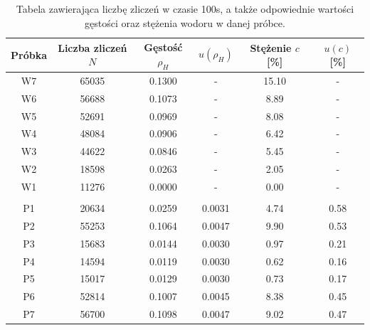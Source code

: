 \documentclass{article}
\begin{document}
\begin{table}[h!]
	\centering
	\caption{Tabela zawierająca liczbę zliczeń w czasie 100s, a także odpowiednie wartości gęstości oraz stężenia wodoru w danej próbce.}
	\begin{tabular}{|c|c|c|c|c|c|}
		\hline
		Próbka & Liczba zliczeń $N$ & Gęstość $\rho _H$ & $u(\rho _H)$ & Stężenie $c$ [\%] & $u(c)$ [\%] \\\hline
		W7 & 65035 & 0.1300 & - & 15.10 & - \\\hline 
		W6 & 56688 & 0.1073 & - & 8.89 & - \\\hline 
		W5 & 52691 & 0.0969 & - & 8.08 & - \\\hline 
		W4 & 48084 & 0.0906 & - & 6.42 & - \\\hline 
		W3 & 44622 & 0.0846 & - & 5.45 & - \\\hline 
		W2 & 18598 & 0.0263 & - & 2.05 & - \\\hline 
		W1 & 11276 & 0.0000 & - & 0.00 & - \\\hline 
		 & & & & & \\\hline
		P1 & 20634 & 0.0259 & 0.0031 & 4.74 & 0.58 \\\hline 
		P2 & 55253 & 0.1064 & 0.0047 & 9.90 & 0.53 \\\hline 
		P3 & 15683 & 0.0144 & 0.0030 & 0.97 & 0.21 \\\hline 
		P4 & 14594 & 0.0119 & 0.0030 & 0.62 & 0.16 \\\hline 
		P5 & 15017 & 0.0129 & 0.0030 & 0.73 & 0.17 \\\hline 
		P6 & 52814 & 0.1007 & 0.0045 & 8.38 & 0.45 \\\hline 
		P7 & 56700 & 0.1098 & 0.0047 & 9.02 & 0.47 \\\hline 
		
		
	\end{tabular}
	\label{tabela_czestosci}
\end{table}



\newpage
\end{document}
